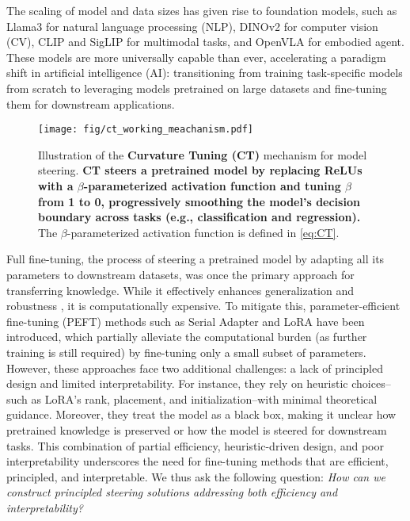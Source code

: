 The scaling of model and data sizes has given rise to foundation models, such as Llama3 \cite{dubey2024llama} for natural language processing (NLP), DINOv2 \cite{oquab2023dinov2} for computer vision (CV), CLIP \cite{radford2021clip}and SigLIP \cite{zhai2023siglip} for multimodal tasks, and OpenVLA \cite{kim2024openvla} for embodied agent. These models are more universally capable than ever, accelerating a paradigm shift in artificial intelligence (AI): transitioning from training task-specific models from scratch to leveraging models pretrained on large datasets and fine-tuning them for downstream applications.

\begin{figure*}[t]
\vskip 0.1in
\begin{center}
\centerline{\texttt{[image: fig/ct\_working\_meachanism.pdf]}}
\caption{\small Illustration of the \textbf{Curvature Tuning (CT)} mechanism for model steering. \textbf{CT steers a pretrained model by replacing ReLUs with a $\beta$-parameterized activation function and tuning $\beta$ from 1 to 0, progressively smoothing the model's decision boundary across tasks (e.g., classification and regression).} The $\beta$-parameterized activation function is defined in \cref{eq:CT}.}
\label{fig:CT}
\end{center}
\vskip -0.1in
\end{figure*}

Full fine-tuning, the process of steering a pretrained model by adapting all its parameters to downstream datasets, was once the primary approach for transferring knowledge. While it effectively enhances generalization \cite{radford2018gpt} and robustness \cite{jeddi2020finetune4robustness}, it is computationally expensive. To mitigate this, parameter-efficient fine-tuning (PEFT) methods such as Serial Adapter \cite{houlsby2019serialadapter} and LoRA \cite{hu2021lora} have been introduced, which partially alleviate the computational burden (as further training is still required) by fine-tuning only a small subset of parameters. However, these approaches face two additional challenges: a lack of principled design and limited interpretability. For instance, they rely on heuristic choices--such as LoRA’s rank, placement, and initialization--with minimal theoretical guidance. Moreover, they treat the model as a black box, making it unclear how pretrained knowledge is preserved or how the model is steered for downstream tasks. This combination of partial efficiency, heuristic-driven design, and poor interpretability underscores the need for fine-tuning methods that are efficient, principled, and interpretable. We thus ask the following question:
{\em How can we construct principled steering solutions addressing both efficiency and interpretability?}


